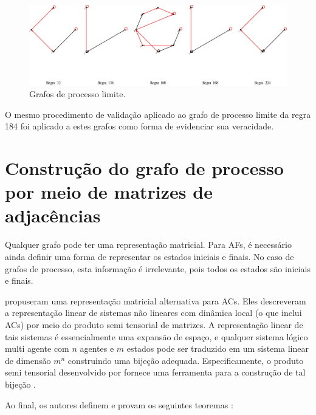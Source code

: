 \documentclass[12pt,a4paper]{article}
\begin{document}
\begin{figure}[H]
\begin{center}
\includegraphics[scale=0.5]{img/Limits.eps}
\caption{Grafos de processo limite.}
\label{fig:limits}
\end{center}
\end{figure}

O mesmo procedimento de validação aplicado ao grafo de processo limite da
regra 184 foi aplicado a estes grafos como forma de evidenciar sua
veracidade.

\newpage

\section{Construção do grafo de processo por meio de matrizes de
adjacências}\label{sec:matrix}

Qualquer grafo pode ter uma representação matricial. Para AFs, é necessário
ainda definir uma forma de representar os estados iniciais e finais. No
caso de grafos de processo, esta informação é irrelevante, pois todos
os estados são iniciais e finais.

 propuseram uma representação matricial alternativa para
ACs. Eles descreveram a representação linear de sistemas não lineares com
dinâmica local (o que inclui ACs) por meio do produto semi tensorial de
matrizes. A representação linear de tais sistemas é essencialmente uma expansão de
espaço, e qualquer sistema lógico multi agente com $n$ agentes e $m$ estados
pode ser traduzido em um sistema linear de dimensão $m^n$ construindo uma
bijeção adequada. Especificamente, o produto semi tensorial desenvolvido
por  fornece uma ferramenta para a construção de
tal bijeção .  

Ao final, os autores definem e provam os seguintes teoremas
:
\end{document}
